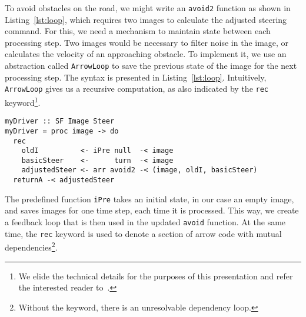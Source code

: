 To avoid obstacles on the road, we might write an \texttt{avoid2} function as shown in Listing~\ref{lst:loop}, which requires two images to calculate the adjusted steering command. 
For this, we need a mechanism to maintain state between each processing step.
Two images would be necessary to filter noise in the image, or calculates the velocity of an approaching obstacle.
To implement it, we use an abstraction called \texttt{ArrowLoop} to  save the previous state of the image for the next processing step.
The syntax is presented in Listing~\ref{lst:loop}.
Intuitively, \texttt{ArrowLoop} gives us a recursive computation, as also indicated by the \texttt{rec} keyword\footnote{We elide the technical details for the purposes of this presentation and refer the interested reader to~\cite{paterson2001icfp}.}.


\begin{lstlisting}[float,caption=Using ArrowLoop to send feedback,label=lst:loop]
myDriver :: SF Image Steer
myDriver = proc image -> do
  rec
    oldI          <- iPre null  -< image
    basicSteer    <-      turn  -< image
    adjustedSteer <- arr avoid2 -< (image, oldI, basicSteer)
  returnA -< adjustedSteer
\end{lstlisting}

The predefined function \texttt{iPre} takes an initial state, in our case an empty image, and saves images for one time step, each time it is processed.
This way, we create a feedback loop that is then used in the updated \texttt{avoid} function.
At the same time, the \texttt{rec} keyword is used to denote a section of arrow code with  mutual dependencies\footnote{Without the keyword, there is an unresolvable dependency loop.}.



 
